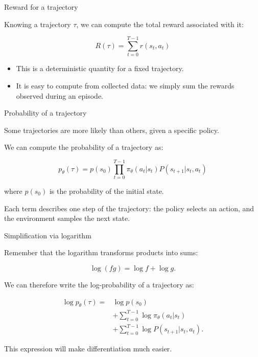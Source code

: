 \documentclass{beamer}
\begin{document}
\begin{frame}{Reward for a trajectory}
	\begin{flushleft}
		
		Knowing a trajectory $\tau$, we can compute the
		total reward associated with it:
		
		\[
		\boxed{
			R(\tau)=\sum_{t=0}^{T-1}r(s_t,a_t)
		}
		\]
		
		\begin{itemize}
			\item This is a deterministic quantity for a fixed
			trajectory.
			\item It is easy to compute from collected data:
			we simply sum the rewards observed during an episode.
		\end{itemize}
		
	\end{flushleft}
\end{frame}


\begin{frame}{Probability of a trajectory}
	\begin{flushleft}
		
		Some trajectories are more likely than others,
		given a specific policy.
		
		We can compute the probability of a trajectory as:
		
		\[
		\boxed{
			p_\theta(\tau)
			=
			p(s_0)
			\prod_{t=0}^{T-1}
			\pi_\theta(a_t|s_t)
			P(s_{t+1}|s_t,a_t)
		}
		\]
		
		where $p(s_0)$ is the probability of the initial state.
		
		Each term describes one step of the trajectory:
		the policy selects an action, and the environment
		samples the next state.
		
	\end{flushleft}
\end{frame}


\begin{frame}{Simplification via logarithm}
	\begin{flushleft}
		
		Remember that the logarithm transforms products into sums:
		
		\[
		\log(fg)=\log f+\log g.
		\]
		
		We can therefore write the log-probability of a trajectory as:
		
		\[
		\boxed{
			\begin{aligned}
				\log p_\theta(\tau)
				={}&\log p(s_0)\\
				&+\sum_{t=0}^{T-1}\log\pi_\theta(a_t|s_t)\\
				&+\sum_{t=0}^{T-1}
				\log P(s_{t+1}|s_t,a_t).
			\end{aligned}
		}
		\]
		
		This expression will make differentiation much easier.
		
	\end{flushleft}
\end{frame}
\end{document}
